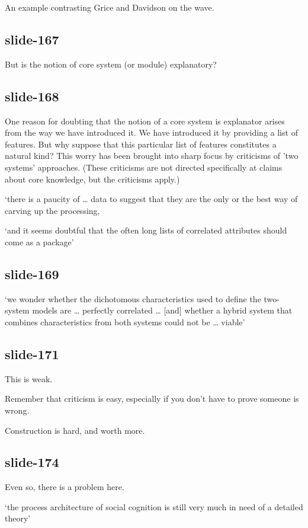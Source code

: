 \documentclass[12pt,\papersize]{extarticle}
\begin{document}
An example contrasting Grice and Davidson on the wave.
 
\subsection{slide-167}
But is the notion of core system (or module) explanatory?
 
\subsection{slide-168}
One reason for doubting that the notion of a core system is explanator arises from the 
way we have introduced it.
We have introduced it by providing a list of features.
But why suppose that this particular list of features constitutes a natural kind?
This worry has been brought into sharp focus by criticisms of 'two systems' approaches.
(These criticisms are not directed specifically at claims about core knowledge, but the criticisms apply.)
 
‘there is a paucity of … data to suggest that they are the only or the best way of carving up the processing,
 
‘and it seems doubtful that the often long lists of correlated attributes should come as a package’
\citep[p.\ 759]{adolphs_conceptual_2010}
 
\subsection{slide-169}
‘we wonder whether the dichotomous characteristics used to define the two-system models are … perfectly correlated …
[and] whether a hybrid system that combines characteristics from both systems could not be … viable’
\citep[p.\ 537]{keren_two_2009}
 
\subsection{slide-171}
This is weak.
 
Remember that criticism is easy, especially if you don't have to prove someone is wrong.
 
Construction is hard, and worth more.
 
\subsection{slide-174}
Even so, there is a problem here.
 
‘the process architecture of social cognition is still very much in need of a detailed theory’
\citep[p.\ 759]{adolphs_conceptual_2010}
 
\end{document}

